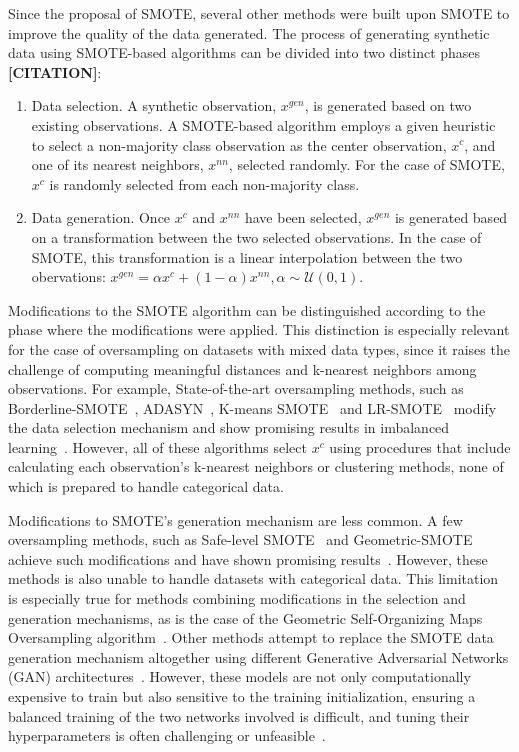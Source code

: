 \documentclass[parskip=full]{scrartcl}
\begin{document}
Since the proposal of SMOTE, several other methods were built upon SMOTE to
improve the quality of the data generated. The process of generating synthetic
data using SMOTE-based algorithms can be divided into two distinct phases
\textbf{[CITATION]}:

\begin{enumerate}
    \item Data selection. A synthetic observation, $x^{gen}$, is generated based
        on two existing observations. A SMOTE-based algorithm employs a given
        heuristic to select a non-majority class observation as the center
        observation, $x^c$, and one of its nearest neighbors, $x^{nn}$,
        selected randomly. For the case of SMOTE, $x^c$ is randomly selected
        from each non-majority class.
    \item Data generation. Once $x^c$ and $x^{nn}$ have been selected, $x^{gen}$
        is generated based on a transformation between the two selected
        observations. In the case of SMOTE, this transformation is 
        a linear interpolation between the two obervations: $x^{gen} = \alpha x^c
        + (1-\alpha) x^{nn}, \alpha \sim \mathcal{U}(0, 1)$.
\end{enumerate}

Modifications to the SMOTE algorithm can be distinguished according to the
phase where the modifications were applied. This distinction is especially
relevant for the case of oversampling on datasets with mixed data types, since
it raises the challenge of computing meaningful distances and k-nearest
neighbors among observations. For example, State-of-the-art oversampling
methods, such as Borderline-SMOTE~\cite{han2005borderline},
ADASYN~\cite{he2008adasyn}, K-means SMOTE~\cite{douzas2018improving} and
LR-SMOTE~\cite{liang2020lr} modify the data selection mechanism and show
promising results in imbalanced learning~\cite{fonseca2021improving}. However,
all of these algorithms select $x^c$ using procedures that include calculating
each observation's k-nearest neighbors or clustering methods, none of which is
prepared to handle categorical data.

Modifications to SMOTE's generation mechanism are less common. A few
oversampling methods, such as Safe-level SMOTE~\cite{bunkhumpornpat2009safe}
and Geometric-SMOTE~\cite{douzas2019geometric} achieve such modifications and
have shown promising results~\cite{douzas2019imbalanced}. However, these
methods is also unable to handle datasets with categorical data. This
limitation is especially true for methods combining modifications in the
selection and generation mechanisms, as is the case of the Geometric
Self-Organizing Maps Oversampling algorithm~\cite{douzas2021g}. Other methods
attempt to replace the SMOTE data generation mechanism altogether using
different Generative Adversarial Networks (GAN)
architectures~\cite{salazar2021generative, koivu2020synthetic, jo2022obgan}.
However, these models are not only computationally expensive to train but also
sensitive to the training initialization, ensuring a balanced training of the
two networks involved is difficult, and tuning their hyperparameters is often
challenging or unfeasible~\cite{gonog2019review}. 
\end{document}
